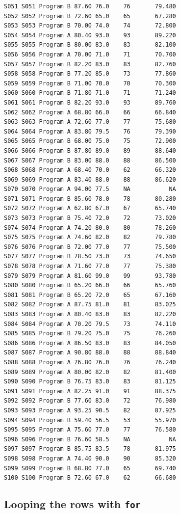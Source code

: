 \documentclass[
  letterpaper,
  DIV=11,
  numbers=noendperiod]{scrreprt}
\begin{document}
\begin{verbatim}
S051 S051 Program B 87.60 76.0    76       79.480
S052 S052 Program B 72.60 65.0    65       67.280
S053 S053 Program B 70.00 74.0    74       72.800
S054 S054 Program A 80.40 93.0    93       89.220
S055 S055 Program B 80.00 83.0    83       82.100
S056 S056 Program A 70.00 71.0    71       70.700
S057 S057 Program B 82.20 83.0    83       82.760
S058 S058 Program B 77.20 85.0    73       77.860
S059 S059 Program B 71.00 70.0    70       70.300
S060 S060 Program B 71.80 71.0    71       71.240
S061 S061 Program B 82.20 93.0    93       89.760
S062 S062 Program A 68.80 66.0    66       66.840
S063 S063 Program A 72.60 77.0    77       75.680
S064 S064 Program A 83.80 79.5    76       79.390
S065 S065 Program B 68.00 75.0    75       72.900
S066 S066 Program B 87.80 89.0    89       88.640
S067 S067 Program B 83.00 88.0    88       86.500
S068 S068 Program A 68.40 70.0    62       66.320
S069 S069 Program A 83.40 88.0    88       86.620
S070 S070 Program A 94.00 77.5    NA           NA
S071 S071 Program B 85.60 78.0    78       80.280
S072 S072 Program A 62.80 67.0    67       65.740
S073 S073 Program B 75.40 72.0    72       73.020
S074 S074 Program A 74.20 80.0    80       78.260
S075 S075 Program A 74.60 82.0    82       79.780
S076 S076 Program B 72.00 77.0    77       75.500
S077 S077 Program B 78.50 73.0    73       74.650
S078 S078 Program A 71.60 77.0    77       75.380
S079 S079 Program A 81.60 99.0    99       93.780
S080 S080 Program B 65.20 66.0    66       65.760
S081 S081 Program B 65.20 72.0    65       67.160
S082 S082 Program A 87.75 81.0    81       83.025
S083 S083 Program A 80.40 83.0    83       82.220
S084 S084 Program A 70.20 79.5    73       74.110
S085 S085 Program B 79.20 75.0    75       76.260
S086 S086 Program A 86.50 83.0    83       84.050
S087 S087 Program A 90.80 88.0    88       88.840
S088 S088 Program A 76.80 76.0    76       76.240
S089 S089 Program A 80.00 82.0    82       81.400
S090 S090 Program B 76.75 83.0    83       81.125
S091 S091 Program A 82.25 91.0    91       88.375
S092 S092 Program B 77.60 83.0    72       76.980
S093 S093 Program A 93.25 90.5    82       87.925
S094 S094 Program B 59.40 56.5    53       55.970
S095 S095 Program A 75.60 77.0    77       76.580
S096 S096 Program B 76.60 58.5    NA           NA
S097 S097 Program B 85.75 83.5    78       81.975
S098 S098 Program A 74.40 90.0    90       85.320
S099 S099 Program B 68.80 77.0    65       69.740
S100 S100 Program B 72.60 67.0    62       66.680
\end{verbatim}

\subsection{\texorpdfstring{Looping the rows with
\texttt{for}}{Looping the rows with for}}\label{looping-the-rows-with-for}
\end{document}
